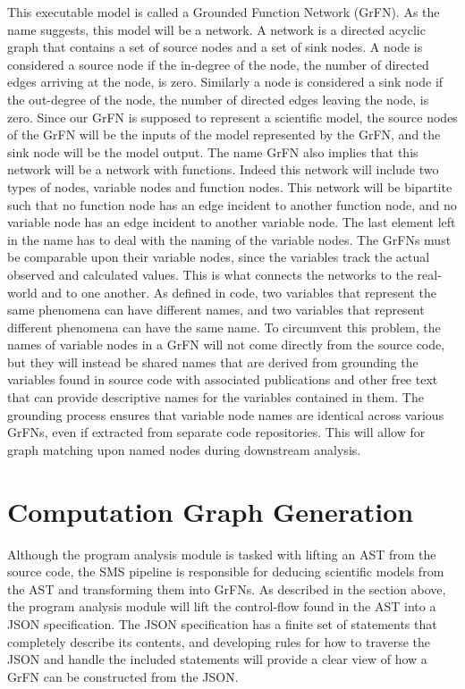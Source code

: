 This executable model is called a Grounded Function Network (GrFN). As the name suggests, this model will be a network. A network is a directed acyclic graph that contains a set of source nodes and a set of sink nodes. A node is considered a source node if the in-degree of the node, the number of directed edges arriving at the node, is zero. Similarly a node is considered a sink node if the out-degree of the node, the number of directed edges leaving the node, is zero. Since our GrFN is supposed to represent a scientific model, the source nodes of the GrFN will be the inputs of the model represented by the GrFN, and the sink node will be the model output. The name GrFN also implies that this network will be a network with functions. Indeed this network will include two types of nodes, variable nodes and function nodes. This network will be bipartite such that no function node has an edge incident to another function node, and no variable node has an edge incident to another variable node. The last element left in the name has to deal with the naming of the variable nodes. The GrFNs must be comparable upon their variable nodes, since the variables track the actual observed and calculated values. This is what connects the networks to the real-world and to one another. As defined in code, two variables that represent the same phenomena can have different names, and two variables that represent different phenomena can have the same name. To circumvent this problem, the names of variable nodes in a GrFN will not come directly from the source code, but they will instead be shared names that are derived from grounding the variables found in source code with associated publications and other free text that can provide descriptive names for the variables contained in them. The grounding process ensures that variable node names are identical across various GrFNs, even if extracted from separate code repositories. This will allow for graph matching upon named nodes during downstream analysis.

\section{Computation Graph Generation\label{sec:cg_gen}}
Although the program analysis module is tasked with lifting an AST from the source code, the SMS pipeline is responsible for deducing scientific models from the AST and transforming them into GrFNs. As described in the section above, the program analysis module will lift the control-flow found in the AST into a JSON specification. The JSON specification has a finite set of statements that completely describe its contents, and developing rules for how to traverse the JSON and handle the included statements will provide a clear view of how a GrFN can be constructed from the JSON.


